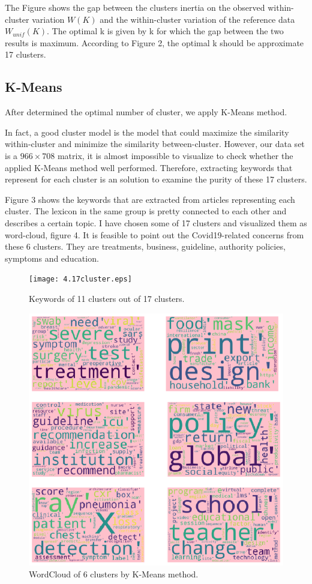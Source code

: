 \documentclass[12pt]{article}
\begin{document}
The Figure  shows the gap between the clusters inertia on the observed within-cluster variation $W(K)$ and the within-cluster variation of the reference data $W_{unif}(K)$. The optimal k is given by k for which the gap between the two results is maximum. According to Figure 2, the optimal k should be approximate 17 clusters.

\subsection{K-Means}

After determined the optimal number of cluster, we apply K-Means method. 

In fact, a good cluster model is the model that could maximize the similarity within-cluster and  minimize the similarity between-cluster. However, our data set is a $966\times708$ matrix, it is almost impossible to visualize to check whether the applied K-Means method well performed. Therefore, extracting keywords that represent for each cluster is an solution to examine the purity of these 17 clusters.

Figure 3 shows the keywords that are extracted from articles representing each cluster. The lexicon in the same group is pretty connected to each other and describes a certain topic. I have chosen some of 17 clusters and visualized them as word-cloud, figure 4. It is feasible to point out the Covid19-related concerns from these 6 clusters. They are treatments, business, guideline, authority policies, symptoms and education. 
\begin{figure}[t!]
    \centering
    \texttt{[image: 4.17cluster.eps]}
    \caption{Keywords of 11 clusters out of 17 clusters.}
\end{figure}

\begin{figure}[!b]
    \centering
    \includegraphics[width= 0.7\columnwidth]{5_cloud.eps}
    \caption{WordCloud of 6 clusters by K-Means method.}
\end{figure}
\end{document}
